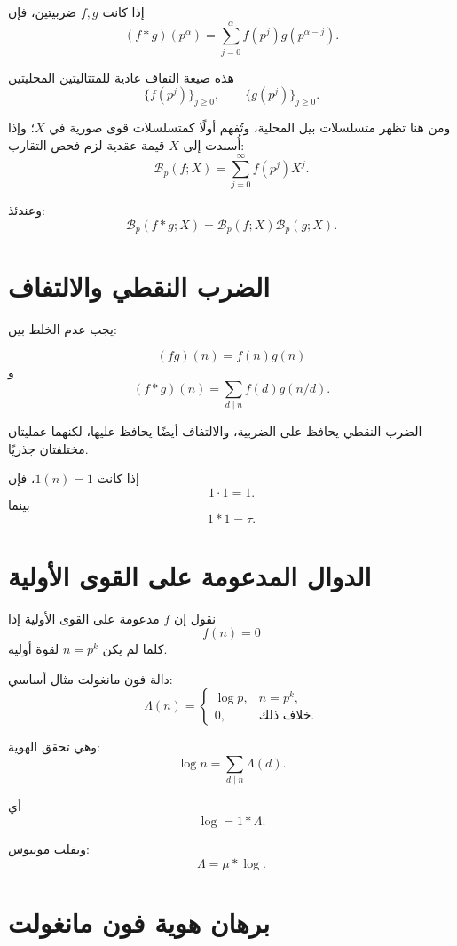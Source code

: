 إذا كانت \(f,g\) ضربيتين، فإن
\[
(f*g)(p^\alpha)
=
\sum_{j=0}^{\alpha}
f(p^j)g(p^{\alpha-j}).
\]

هذه صيغة التفاف عادية للمتتاليتين المحليتين
\[
\{f(p^j)\}_{j\geq0},
\qquad
\{g(p^j)\}_{j\geq0}.
\]

ومن هنا تظهر متسلسلات بيل المحلية، وتُفهم أولًا كمتسلسلات قوى صورية في
\(X\)؛ وإذا أُسندت إلى \(X\) قيمة عقدية لزم فحص التقارب:
\[
\mathcal{B}_p(f;X)
=
\sum_{j=0}^{\infty}f(p^j)X^j.
\]

وعندئذ:
\[
\mathcal{B}_p(f*g;X)
=
\mathcal{B}_p(f;X)\mathcal{B}_p(g;X).
\]

\section{الضرب النقطي والالتفاف}

يجب عدم الخلط بين:

\[
(fg)(n)=f(n)g(n)
\]
و
\[
(f*g)(n)=\sum_{d\mid n}f(d)g(n/d).
\]

الضرب النقطي يحافظ على الضربية، والالتفاف أيضًا يحافظ عليها، لكنهما عمليتان مختلفتان جذريًا.

\begin{example}
إذا كانت \(1(n)=1\)، فإن
\[
1\cdot1=1.
\]
بينما
\[
1*1=\tau.
\]
\end{example}

\section{الدوال المدعومة على القوى الأولية}

\begin{definition}
نقول إن \(f\) مدعومة على القوى الأولية إذا
\[
f(n)=0
\]
كلما لم يكن \(n=p^k\) لقوة أولية.
\end{definition}

دالة فون مانغولت مثال أساسي:
\[
\Lambda(n)
=
\begin{cases}
\log p,&n=p^k,\\
0,&\text{خلاف ذلك}.
\end{cases}
\]

وهي تحقق الهوية:
\[
\log n
=
\sum_{d\mid n}\Lambda(d).
\]

أي
\[
\log
=
1*\Lambda.
\]

وبقلب موبيوس:
\[
\Lambda
=
\mu*\log.
\]

\section{برهان هوية فون مانغولت}

